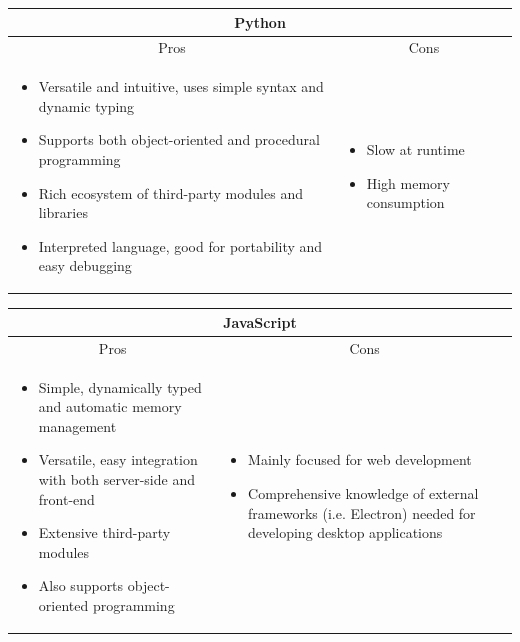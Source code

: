 \documentclass[../main/main.tex]{subfiles}
\begin{document}
\begin{longtable}{ll}
    \toprule
    \multicolumn{2}{c}{Python}\\
    \midrule
    \multicolumn{1}{c}{Pros} & \multicolumn{1}{c}{Cons}\\
    \midrule

    \parbox[t][][t]{0.5\textwidth}{
        \begin{itemize}
            \item Versatile and intuitive, uses simple syntax and dynamic typing
            \item Supports both object-oriented and procedural programming
            \item Rich ecosystem of third-party modules and libraries
            \item Interpreted language, good for portability and easy debugging
        \end{itemize}
    } & \parbox[t][][t]{0.5\textwidth}{
        \begin{itemize}
            \item Slow at runtime
            \item High memory consumption
        \end{itemize}
    }
    \\
    \bottomrule
\end{longtable}

\begin{longtable}{ll}
    \toprule
    \multicolumn{2}{c}{JavaScript}\\
    \midrule
    \multicolumn{1}{c}{Pros} & \multicolumn{1}{c}{Cons}\\
    \midrule

    \parbox[t][][t]{0.5\textwidth}{
        \begin{itemize}
            \item Simple, dynamically typed and automatic memory management
            \item Versatile, easy integration with both server-side and front-end
            \item Extensive third-party modules
            \item Also supports object-oriented programming
        \end{itemize}
    } & \parbox[t][][t]{0.5\textwidth}{
        \begin{itemize}
            \item Mainly focused for web development
            \item Comprehensive knowledge of external frameworks (i.e. Electron) needed for developing desktop applications
        \end{itemize}
    }
    \\
    \bottomrule
\end{longtable}
\end{document}
